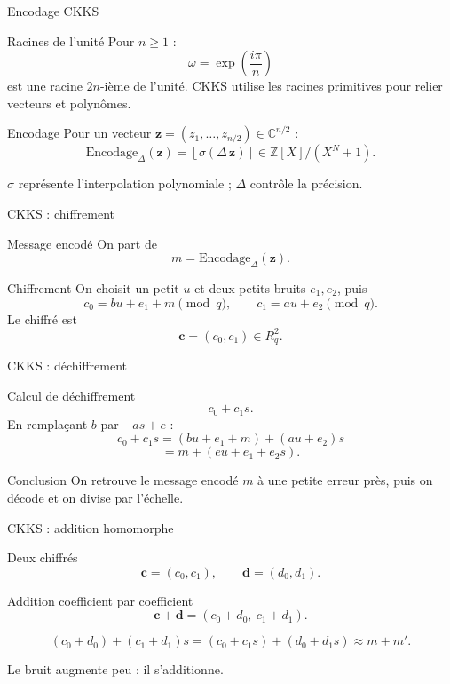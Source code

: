 \documentclass[10pt,aspectratio=169]{beamer}
\newcommand{\ZZ}{\mathbb{Z}}
\newcommand{\CC}{\mathbb{C}}
\begin{document}
\begin{frame}{Encodage CKKS}
  \small
  \begin{block}{Racines de l'unité}
    Pour $n\geq 1$ :
    \[
      \omega=\exp\left(\frac{i\pi}{n}\right)
    \]
    est une racine $2n$-ième de l'unité. CKKS utilise les racines primitives pour relier vecteurs et polynômes.
  \end{block}

  \begin{block}{Encodage}
    Pour un vecteur $\mathbf z=(z_1,\ldots,z_{n/2})\in\CC^{n/2}$ :
    \[
      \mathrm{Encodage}_{\Delta}(\mathbf z)
      =
      \left\lfloor \sigma(\Delta\, \mathbf z)\right\rceil
      \in \ZZ[X]/(X^N+1).
    \]
  \end{block}

  $\sigma$ représente l'interpolation polynomiale ; $\Delta$ contrôle la précision.
\end{frame}

\begin{frame}{CKKS : chiffrement}
  \begin{block}{Message encodé}
    On part de
    \[
      m=\mathrm{Encodage}_{\Delta}(\mathbf z).
    \]
  \end{block}

  \begin{block}{Chiffrement}
    On choisit un petit $u$ et deux petits bruits $e_1,e_2$, puis
    \[
      c_0=bu+e_1+m\pmod q,
      \qquad
      c_1=au+e_2\pmod q.
    \]
    Le chiffré est
    \[
      \mathbf c=(c_0,c_1)\in R_q^2.
    \]
  \end{block}
\end{frame}

\begin{frame}{CKKS : déchiffrement}
  \small
  \begin{block}{Calcul de déchiffrement}
    \[
      c_0+c_1s.
    \]
    En remplaçant $b$ par $-as+e$ :
    \[
      c_0+c_1s
      =
      (bu+e_1+m)+(au+e_2)s
    \]
    \[
      =
      m+(eu+e_1+e_2s).
    \]
  \end{block}

  \begin{exampleblock}{Conclusion}
    On retrouve le message encodé $m$ à une petite erreur près, puis on décode et on divise par l'échelle.
  \end{exampleblock}
\end{frame}

\begin{frame}{CKKS : addition homomorphe}
  \begin{block}{Deux chiffrés}
    \[
      \mathbf c=(c_0,c_1),\qquad
      \mathbf d=(d_0,d_1).
    \]
  \end{block}

  \begin{block}{Addition coefficient par coefficient}
    \[
      \mathbf c+\mathbf d=(c_0+d_0,\ c_1+d_1).
    \]
  \end{block}

  \[
    (c_0+d_0)+(c_1+d_1)s
    =
    (c_0+c_1s)+(d_0+d_1s)
    \approx m+m'.
  \]

  Le bruit augmente peu : il s'additionne.
\end{frame}
\end{document}
